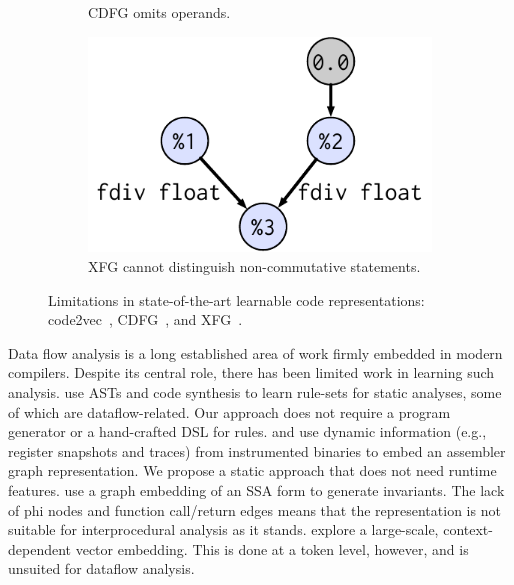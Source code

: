 \begin{figure}[t]
\begin{subfigure}{.15\linewidth}
    \caption{CDFG omits operands.}
    \label{subfig:cdfg}
  \end{subfigure}
  \hfill
  \begin{subfigure}{.3\linewidth}
    \vspace{2em}
    \includegraphics[width=.9\linewidth]{images/inst2vec.pdf}
    \caption{XFG cannot distinguish non-commutative statements.}
    \label{subfig:inst2vec}
  \end{subfigure}
  \vspace{-.3em}
  \caption{%
    Limitations in state-of-the-art learnable code representations:
    code2vec~\citep{Alon2018a}, CDFG~\citep{Brauckmann2020}, and
    XFG~\citep{Ben-nun2018}.
    \vspace{-1em}
  }
\end{figure}

Data flow analysis is a long established area of work firmly embedded in modern
compilers. Despite its central role, there has been limited work in learning
such analysis. \citet{Bielik2017a} use ASTs and code synthesis to learn
rule-sets for static analyses, some of which are dataflow-related. Our approach
does not require a program generator or a hand-crafted DSL for rules.
\citet{Shi2019} and \citet{wang2020blended} use dynamic information (e.g.,
register snapshots and traces) from instrumented binaries to embed an assembler
graph representation. We propose a static approach that does not need runtime
features. \citet{Si2018} use a graph embedding of an SSA form to generate
invariants. The lack of phi nodes and function call/return edges means that the
representation is not suitable for interprocedural analysis as it stands.
\citet{Kanade2019} explore a large-scale, context-dependent vector embedding.
This is done at a token level, however, and is unsuited for dataflow analysis.

